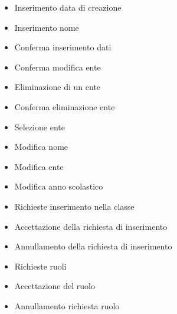 \begin{itemize}
	\item {} Inserimento data di creazione 
	\item {} Inserimento nome 
	\item {} Conferma inserimento dati 
	\item {} Conferma modifica ente 
	\item {} Eliminazione di un ente
	\item {} Conferma eliminazione ente 
	\item {} Selezione ente
	\item {} Modifica nome
	\item {} Modifica ente 
	\item {} Modifica anno scolastico
	\item {} Richieste inserimento nella classe
	\item {} Accettazione della richiesta di inserimento
	\item {} Annullamento della richiesta di inserimento
	\item {} Richieste ruoli
	\item {} Accettazione del ruolo
	\item {} Annullamento richiesta ruolo
\end{itemize}

